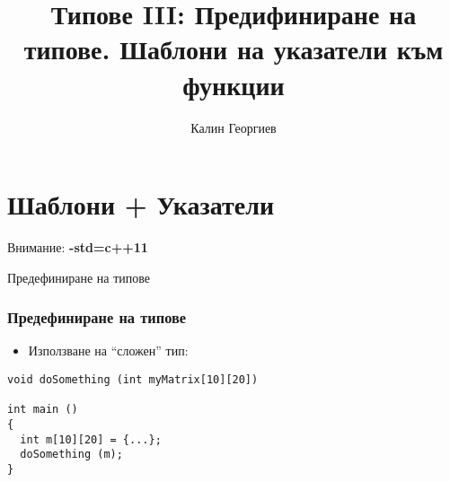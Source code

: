 \documentclass{beamer}
\begin{document}
\title[Обектно ориентирано програмиране]{Типове III: Предифиниране на типове. Шаблони на указатели към функции} 
\author{Калин Георгиев} 
\frame{\titlepage} 


\section{Шаблони + Указатели} 




\begin{frame}
\centerline{Внимание: \textbf{-std=c++11}}
\end{frame}

\begin{frame}
\centerline{Предефиниране на типове}
\end{frame}

\begin{frame}[fragile]
\frametitle{Предефиниране на типове}

\begin{itemize}
  \item Използване на ``сложен'' тип:
\end{itemize}

\begin{flushleft}
\begin{lstlisting}
void doSomething (int myMatrix[10][20])

int main ()
{
  int m[10][20] = {...};
  doSomething (m);
}
\end{lstlisting}	
\end{flushleft}

\end{frame}
\end{document}
